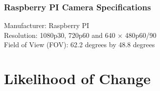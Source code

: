\documentclass [10pt]{article}
\begin{document}

\subsubsection{Raspberry PI Camera Specifications}
Manufacturer: Raspberry PI \\
Resolution: 1080p30, 720p60 and 640 × 480p60/90\\
Field of View (FOV): 62.2 degrees by 48.8 degrees\\



\section{Likelihood of Change}
\end{document}
